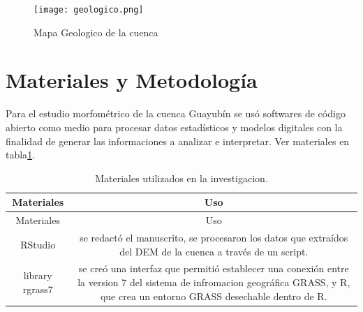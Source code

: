 \documentclass[11pt,]{article}
\begin{document}
\begin{figure}
\centering
\texttt{[image: geologico.png]}
\caption{Mapa Geologico de la cuenca\label{magecu}}
\end{figure}

\section{Materiales y Metodología}\label{materiales-y-metodologuxeda}

Para el estudio morfométrico de la cuenca Guayubín se usó softwares de
código abierto como medio para procesar datos estadísticos y modelos
digitales con la finalidad de generar las informaciones a analizar e
interpretar. Ver materiales en tabla\ref{tab:materiales}.

\begin{longtable}[]{@{}cc@{}}
\caption{\label{tab:materiales} Materiales utilizados en la
investigacion.}\tabularnewline
\toprule
\begin{minipage}[b]{0.11\columnwidth}\centering\strut
Materiales\strut
\end{minipage} & \begin{minipage}[b]{0.83\columnwidth}\centering\strut
Uso\strut
\end{minipage}\tabularnewline
\midrule
\endfirsthead
\toprule
\begin{minipage}[b]{0.11\columnwidth}\centering\strut
Materiales\strut
\end{minipage} & \begin{minipage}[b]{0.83\columnwidth}\centering\strut
Uso\strut
\end{minipage}\tabularnewline
\midrule
\endhead
\begin{minipage}[t]{0.11\columnwidth}\centering\strut
RStudio\strut
\end{minipage} & \begin{minipage}[t]{0.83\columnwidth}\centering\strut
se redactó el manuscrito, se procesaron los datos que extraídos del DEM
de la cuenca a través de un script.\strut
\end{minipage}\tabularnewline
\begin{minipage}[t]{0.11\columnwidth}\centering\strut
library rgrass7\strut
\end{minipage} & \begin{minipage}[t]{0.83\columnwidth}\centering\strut
se creó una interfaz que permitió establecer una conexión entre la
version 7 del sistema de infromacion geográfica GRASS, y R, que crea un
entorno GRASS desechable dentro de R.\strut

\end{minipage}
\end{longtable}
\end{document}
